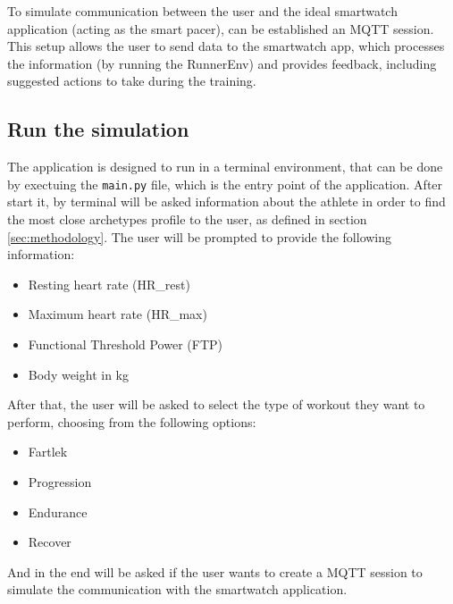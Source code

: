 To simulate communication between the user and the ideal smartwatch application (acting as the smart pacer), can be established an MQTT session. This setup allows the user to send data to the smartwatch app, which processes the information (by running the RunnerEnv) and provides feedback, including suggested actions to take during the training.

\subsection{Run the simulation}\label{subsec:start-application}
The application is designed to run in a terminal environment, that can be done by exectuing the \texttt{main.py} file, which is the entry point of the application.
After start it, by terminal will be asked information about the athlete in order to find the most close archetypes profile to the user, as defined in section \ref{sec:methodology}. The user will be prompted to provide the following information:
\begin{itemize}
  \item Resting heart rate (HR_rest)
  \item Maximum heart rate (HR_max)
  \item Functional Threshold Power (FTP)
  \item Body weight in kg
\end{itemize}

After that, the user will be asked to select the type of workout they want to perform, choosing from the following options:
\begin{itemize}
  \item Fartlek
  \item Progression
  \item Endurance
  \item Recover
\end{itemize}

And in the end will be asked if the user wants to create a MQTT session to simulate the communication with the smartwatch application. 

